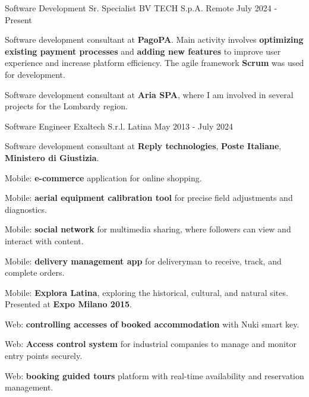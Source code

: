 

\begin{cventries}

  \cventry
    {Software Development Sr. Specialist} %
    {BV TECH S.p.A.} %
    {Remote} %
    {July 2024 - Present} %
    {
      \begin{cvitems} %
        \item {Software development consultant at \textbf{PagoPA}. Main activity involves \textbf{optimizing existing payment processes} and \textbf{adding new features} to improve user experience and increase platform efficiency. The agile framework \textbf{Scrum} was used for development.}
        \item {Software development consultant at \textbf{Aria SPA}, where I am involved in several projects for the Lombardy region.}  
      \end{cvitems}
    }

  \cventry
    {Software Engineer} %
    {Exaltech S.r.l.} %
    {Latina} %
    {May 2013 - July 2024} %
    {
      \begin{cvitems} %
        \item {Software development consultant at \textbf{Reply technologies}, \textbf{Poste Italiane}, \textbf{Ministero di Giustizia}.}
        \item {Mobile: \textbf{e-commerce} application for online shopping.}
        \item {Mobile: \textbf{aerial equipment calibration tool} for precise field adjustments and diagnostics.}
        \item {Mobile: \textbf{social network} for multimedia sharing, where followers can view and interact with content.}
        \item {Mobile: \textbf{delivery management app} for deliveryman to receive, track, and complete orders.}
        \item {Mobile: \textbf{Explora Latina}, exploring the historical, cultural, and natural sites. Presented at \textbf{Expo Milano 2015}.}
        \item {Web: \textbf{controlling accesses of booked accommodation} with Nuki smart key.}
        \item {Web: \textbf{Access control system} for industrial companies to manage and monitor entry points securely.}
        \item {Web: \textbf{booking guided tours} platform with real-time availability and reservation management.}
      \end{cvitems}
    }

\end{cventries}
